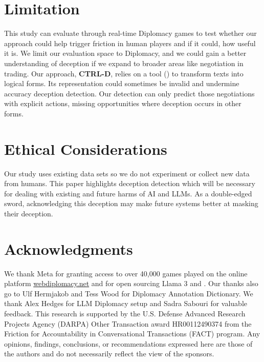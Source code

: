 \section*{Limitation}
This study can evaluate through real-time Diplomacy games to test whether our approach could help trigger friction in human players and if it could, how useful it is. We limit our evaluation space to Diplomacy, and we could gain a better understanding of deception if we expand to broader areas like negotiation in trading. Our approach, \textbf{CTRL-D}, relies on a tool () to transform texts into logical forms. Its representation could sometimes be invalid and undermine accuracy deception detection. Our detection can only predict those negotiations with explicit actions, missing opportunities where deception occurs in other forms.

\section*{Ethical Considerations}
Our study uses existing data sets so we do not experiment or collect new data from humans. This paper highlights deception detection which will be necessary for dealing with existing and future harms of AI and LLMs.  As a double-edged sword, acknowledging this deception may make future systems better at masking their deception.


\section*{Acknowledgments}
We thank Meta for granting access to over 40,000 games played on the online platform \url{webdiplomacy.net} and for open sourcing Llama 3 and \cicero{}. 
Our thanks also go to Ulf Hermjakob and Tess Wood for Diplomacy  Annotation Dictionary.
We thank Alex Hedges for LLM Diplomacy setup and Sadra Sabouri for valuable feedback.
This research is supported by the U.S. Defense Advanced Research Projects Agency (DARPA) Other Transaction award HR00112490374 from the Friction for Accountability in Conversational Transactions (FACT) program.
%
Any opinions, findings, conclusions, or recommendations expressed here are those of the authors and
do not necessarily reflect the view of the sponsors.